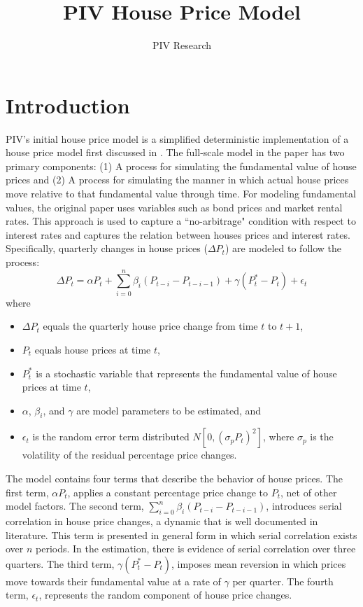 \documentclass{article}
\begin{document}
\title{PIV House Price Model}
\author{PIV Research}
\maketitle
\section{Introduction}
PIV's initial house price model is a simplified deterministic implementation of a house price model first discussed in \cite{Stoll13}. The full-scale model in the paper has two primary components:  (1) A process for simulating the fundamental value of house prices and (2) A process for simulating the manner in which actual house prices move relative to that fundamental value through time. For modeling fundamental values, the original paper uses variables such as bond prices and market rental rates. This approach is used to capture a ``no-arbitrage" condition with respect to interest rates and captures the relation between houses prices and interest rates. Specifically, quarterly changes in house prices ($\Delta P_t$) are modeled to follow the process:
\begin{equation}\label{eq:home-price-model}
\Delta P_{t} = \alpha P_t + \sum^{n}_{i=0} \beta_i (P_{t-i} - P_{t-i-1}) + \gamma (P^{*}_{t} - P_t) + \epsilon_t
\end{equation}
where
\begin{itemize}
\item[] $\Delta P_{t}$ equals the quarterly house price change from time $t$ to $t + 1$,
\item[] $P_t$ equals house prices at time $t$,
\item[] $P^{*}_{t}$ is a stochastic variable that represents the fundamental value of house prices at time $t$,
\item[] $\alpha$, $\beta_i$, and $\gamma$ are model parameters to be estimated, and
\item[] $\epsilon_{t}$ is the random error term distributed $N[0, (\sigma_{p} P_t)^2]$, where $\sigma_p$ is the volatility of the residual percentage price changes.
\end{itemize}
The model contains four terms that describe the behavior of house prices. The first term, $\alpha P_t$, applies a constant percentage price change to $P_t$, net of other model factors. The second term, $\sum^{n}_{i=0} \beta_i (P_{t-i} - P_{t - i - 1})$, introduces serial correlation in house price changes, a dynamic that is well documented in literature. This term is presented in general form in which serial correlation exists over $n$ periods. In the estimation, there is evidence of serial correlation over three quarters. The third term, $\gamma (P^{*}_{t} - P_t)$, imposes mean reversion in which prices move towards their fundamental value at a rate of $\gamma$ per quarter. The fourth term, $\epsilon_t$, represents the random component of house price changes.
\end{document}
